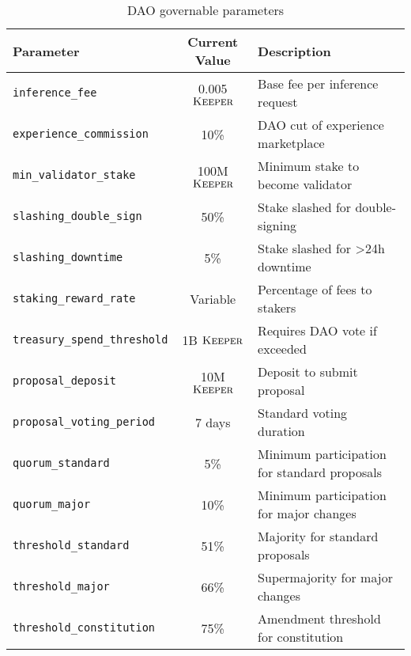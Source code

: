 \documentclass[11pt,letterpaper]{article}
\theoremstyle{definition}
\theoremstyle{remark}
\newcommand{\KEEPER}{\textsc{Keeper}}
\begin{document}
\begin{table}[h]
\centering
\small
\begin{tabular}{lcp{5cm}}
\toprule
\textbf{Parameter} & \textbf{Current Value} & \textbf{Description} \\
\midrule
\texttt{inference\_fee} & 0.005 $\KEEPER$ & Base fee per inference request \\
\texttt{experience\_commission} & 10\% & DAO cut of experience marketplace \\
\texttt{min\_validator\_stake} & 100M $\KEEPER$ & Minimum stake to become validator \\
\texttt{slashing\_double\_sign} & 50\% & Stake slashed for double-signing \\
\texttt{slashing\_downtime} & 5\% & Stake slashed for >24h downtime \\
\texttt{staking\_reward\_rate} & Variable & Percentage of fees to stakers \\
\texttt{treasury\_spend\_threshold} & 1B $\KEEPER$ & Requires DAO vote if exceeded \\
\texttt{proposal\_deposit} & 10M $\KEEPER$ & Deposit to submit proposal \\
\texttt{proposal\_voting\_period} & 7 days & Standard voting duration \\
\texttt{quorum\_standard} & 5\% & Minimum participation for standard proposals \\
\texttt{quorum\_major} & 10\% & Minimum participation for major changes \\
\texttt{threshold\_standard} & 51\% & Majority for standard proposals \\
\texttt{threshold\_major} & 66\% & Supermajority for major changes \\
\texttt{threshold\_constitution} & 75\% & Amendment threshold for constitution \\
\bottomrule
\end{tabular}
\caption{DAO governable parameters}
\label{tab:dao_params}
\end{table}
\end{document}

